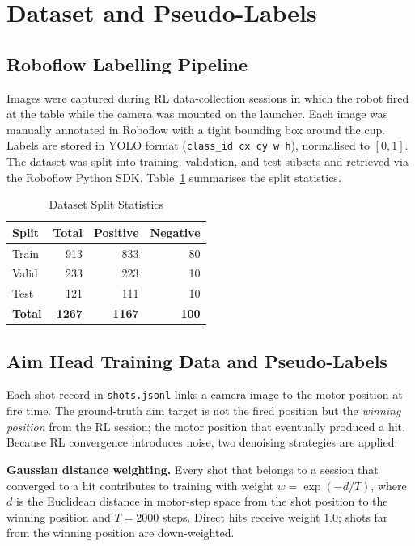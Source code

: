 \documentclass[conference]{IEEEtran}
\begin{document}
\section{Dataset and Pseudo-Labels}
\label{sec:dataset}

\subsection{Roboflow Labelling Pipeline}

Images were captured during RL data-collection sessions in which the robot
fired at the table while the camera was mounted on the launcher.  Each image
was manually annotated in Roboflow with a tight bounding box around the cup.
Labels are stored in YOLO format (\texttt{class\_id cx cy w h}), normalised to
$[0,1]$.  The dataset was split into training, validation, and test subsets and
retrieved via the Roboflow Python SDK.  Table~\ref{tab:splits} summarises the
split statistics.

\begin{table}[ht]
\centering
\caption{Dataset Split Statistics}
\label{tab:splits}
\begin{tabular}{lrrr}
\toprule
Split & Total & Positive & Negative \\
\midrule
Train & 913  & 833  & 80  \\
Valid & 233  & 223  & 10  \\
Test  & 121  & 111  & 10  \\
\midrule
\textbf{Total} & \textbf{1267} & \textbf{1167} & \textbf{100} \\
\bottomrule
\end{tabular}
\end{table}

\subsection{Aim Head Training Data and Pseudo-Labels}

Each shot record in \texttt{shots.jsonl} links a camera image to the motor
position at fire time.  The ground-truth aim target is not the fired position
but the \emph{winning position} from the RL session; the motor position that
eventually produced a hit.  Because RL convergence introduces noise, two
denoising strategies are applied.

\textbf{Gaussian distance weighting.}  Every shot that belongs to a session
that converged to a hit contributes to training with weight
$w = \exp(-d/T)$, where $d$ is the Euclidean distance in motor-step space from
the shot position to the winning position and $T=2000$ steps.  Direct hits
receive weight $1.0$; shots far from the winning position are down-weighted.
\end{document}
